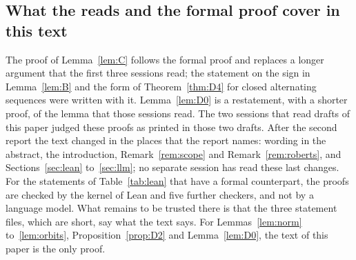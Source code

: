 \documentclass[11pt]{amsart}
\theoremstyle{definition}
\theoremstyle{remark}
\numberwithin{equation}{section}
\begin{document}
\subsection*{What the reads and the formal proof cover in this text} The proof of Lemma~\ref{lem:C}
follows the formal proof and replaces a longer argument that the first three sessions read; the
statement on the sign in Lemma~\ref{lem:B} and the form of Theorem~\ref{thm:D4} for closed alternating
sequences were written with it. Lemma~\ref{lem:D0} is a restatement, with a shorter proof, of the lemma
that those sessions read. The two sessions that read drafts of this paper judged these proofs as
printed in those two drafts. After the second report the text changed in
the places that the report names: wording in the abstract, the introduction, Remark~\ref{rem:scope} and
Remark~\ref{rem:roberts}, and Sections~\ref{sec:lean} to~\ref{sec:llm}; no separate session has read
these last changes. For the statements of Table~\ref{tab:lean} that have a formal counterpart, the
proofs are checked by the kernel of Lean and five further checkers, and not by a language model. What
remains to be trusted there is that the three statement files, which are short, say what the text
says. For Lemmas~\ref{lem:norm} to~\ref{lem:orbits}, Proposition~\ref{prop:D2} and Lemma~\ref{lem:D0},
the text of this paper is the only proof.



\end{document}
